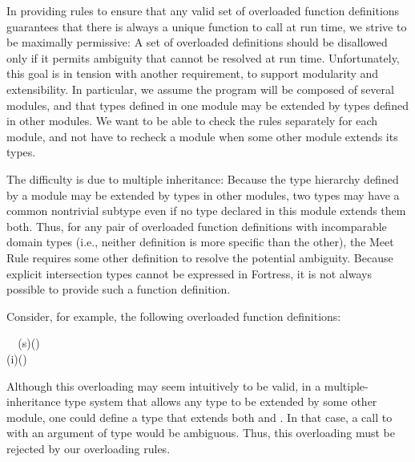 \documentclass[10pt]{sigplanconf}
\begin{document}
In providing rules to ensure 
that any valid set of overloaded function definitions 
guarantees that there is always a unique function to call at run time, 
we strive to be maximally permissive: 
A set of overloaded definitions should be disallowed 
only if it permits ambiguity
that cannot be resolved at run time.  
Unfortunately, this goal is in tension with another requirement, 
to support modularity and extensibility.
In particular, 
we assume the program will be composed of several modules, 
and that types defined in one module 
may be extended by types defined in other modules.
We want to be able to check the rules separately for each module, 
and not have to recheck a module 
when some other module extends its types.


The difficulty is due to multiple inheritance: 
Because the type hierarchy defined by a module may be extended 
by types in other modules, 
two types may have a common nontrivial subtype 
even if no type declared in this module 
extends them both.
Thus,
for any pair of overloaded function definitions with incomparable domain types
(i.e., neither definition is more specific than the other),
the Meet Rule requires some other definition to resolve the potential ambiguity.
Because explicit intersection types cannot be expressed in Fortress, 
it is not always possible to provide such a function definition.

Consider, for example, the following overloaded function definitions:

\small
\begin{FortressCode}
{\tt ~~}\+(s\COLON {})\COLON(\ultrathin)  \\
  (i\COLON {})\COLON(\ultrathin)\-
\end{FortressCode}
\normalsize
Although this overloading may seem intuitively to be valid,
in a multiple-inheritance type system 
that allows any type to be extended by some other module, 
one could define a type  
that extends both  and .
In that case,
a call to  with an argument of type  
would be ambiguous.
Thus, this overloading must be rejected by our overloading rules.
\end{document}
